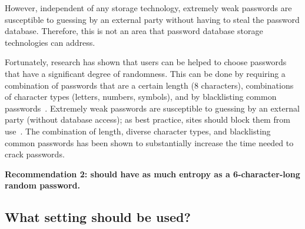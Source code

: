 However, independent of any storage technology, extremely weak passwords 
are susceptible to guessing by an external party without having to steal
the password database.  Therefore, this is not an area that password database
storage technologies can address.

Fortunately, research has shown that users can be helped to choose passwords
that have a significant degree of randomness.  This can be done by requiring a combination of
passwords that are a certain length (8 characters), combinations
of character types (letters, numbers, symbols), and by blacklisting common
passwords~\cite{weir2010passwordpolicies}.  Extremely weak passwords are
susceptible to guessing by an external party (without database access); as
best practice, sites should block them from use~\cite{bancommonpasswords,
weir2010passwordpolicies, cormac2014telepathwords,
kelley2012guessingpasswords}.  The combination of length, diverse character
types, and blacklisting common passwords has been shown to substantially
increase the time needed to crack passwords.



{\bf Recommendation 2: \Thresholdaccounts should have
as much entropy as a 6-character-long random password.}




\subsection{{\bf What \partialbytes setting should be used?}}
\label{SUBSEC:security-properties}


